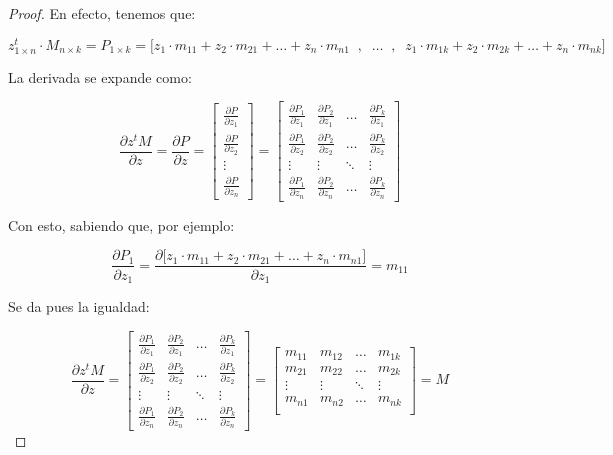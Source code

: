 \documentclass[11pt]{scrartcl}
\begin{document}
\begin{proof}
  En efecto, tenemos que:

\[
z^t_{1 \times n} \cdot M_{n \times k} = P_{1 \times k} = \Big[
z_1 \cdot m_{11} + z_2 \cdot m_{21} + \dots + z_n \cdot m_{n1} 
\;\; , \;\; \dots \;\; , \;\;
z_1 \cdot m_{1k} + z_2 \cdot m_{2k} + \dots + z_n \cdot m_{nk} \Big]
\]

La derivada se expande como:

\[
\frac{\partial z^t M}{\partial z} = \frac{\partial P}{\partial z} =
\begin{bmatrix}
\frac{\partial P}{\partial z_1}  \\
\frac{\partial P}{\partial z_2}  \\
\vdots \\
\frac{\partial P}{\partial z_n}
\end{bmatrix}
=
\begin{bmatrix}
\frac{\partial P_1}{\partial z_1} & \frac{\partial P_2}{\partial z_1} & \dots & \frac{\partial P_k}{\partial z_1} \\
\frac{\partial P_1}{\partial z_2} & \frac{\partial P_2}{\partial z_2} & \dots & \frac{\partial P_k}{\partial z_2} \\
\vdots & \vdots & \ddots & \vdots \\
\frac{\partial P_1}{\partial z_n} & \frac{\partial P_2}{\partial z_n} & \dots & \frac{\partial P_k}{\partial z_n}
\end{bmatrix}
\]

Con esto, sabiendo que, por ejemplo:

\[
\frac{\partial P_1}{\partial z_1} = 
\frac{\partial \Big[ z_1 \cdot m_{11} + z_2 \cdot m_{21} + \dots + z_n \cdot m_{n1} \Big]}{\partial z_1} = m_{11}
\]

Se da pues la igualdad:

\[
\frac{\partial z^t M}{\partial z}
=
\begin{bmatrix}
\frac{\partial P_1}{\partial z_1} & \frac{\partial P_2}{\partial z_1} & \dots & \frac{\partial P_k}{\partial z_1} \\
\frac{\partial P_1}{\partial z_2} & \frac{\partial P_2}{\partial z_2} & \dots & \frac{\partial P_k}{\partial z_2} \\
\vdots & \vdots & \ddots & \vdots \\
\frac{\partial P_1}{\partial z_n} & \frac{\partial P_2}{\partial z_n} & \dots & \frac{\partial P_k}{\partial z_n}
\end{bmatrix}
=
\begin{bmatrix}
m_{11} & m_{12} & \dots & m_{1k} \\
m_{21} & m_{22} & \dots & m_{2k} \\
\vdots & \vdots & \ddots & \vdots \\
m_{n1} & m_{n2} & \dots & m_{nk} \\
\end{bmatrix}
=
M
\]

\end{proof}
\end{document}
